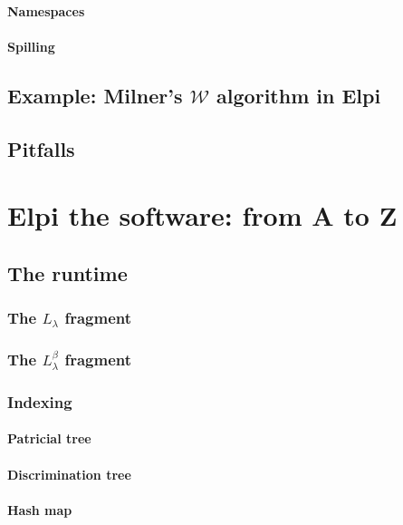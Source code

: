 \documentclass[a4paper, 11pt]{book}
\begin{document}
\subsubsection{Namespaces}
\subsubsection{Spilling}

\section{Example: Milner's $\mathcal{W}$ algorithm in Elpi}

\section{Pitfalls}

\chapter{Elpi the software: from A to Z}

\section{The runtime}

\cite{dunchev15lpar}

\subsection{The $L_{\lambda}$ fragment}
\subsection{The $L_{\lambda}^{\beta}$ fragment}
\cite{Michaylov1993HigherOrderLP}

\subsection{Indexing}
\subsubsection{Patricial tree}
\subsubsection{Discrimination tree}
\subsubsection{Hash map}
\end{document}
